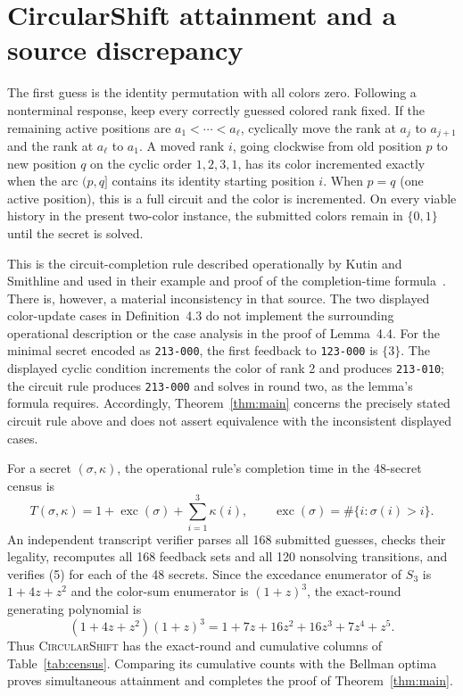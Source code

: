 \documentclass[11pt]{article}
\newcommand{\bits}{\{0,1\}}
\begin{document}
\section{CircularShift attainment and a source discrepancy}\label{sec:cs}

The first guess is the identity permutation with all colors zero.  Following a
nonterminal response, keep every correctly guessed colored rank fixed.  If the
remaining active positions are
$a_1<\cdots<a_\ell$, cyclically move the rank at $a_j$ to $a_{j+1}$ and the
rank at $a_\ell$ to $a_1$.  A moved rank $i$, going clockwise from old position
$p$ to new position $q$ on the cyclic order $1,2,3,1$, has its color incremented
exactly when the arc $(p,q]$ contains its identity starting position $i$.
When $p=q$ (one active position), this is a full circuit and the color is
incremented.  On every viable history in the present two-color instance, the
submitted colors remain in $\bits$ until the secret is solved.

This is the circuit-completion rule described operationally by Kutin and
Smithline and used in their example and proof of the completion-time
formula~\cite[Definition~4.3, Figure~6, and Lemma~4.4]{KutinSmithline2026}.
There is, however, a material inconsistency in that source.  The two displayed
color-update cases in Definition~4.3 do not implement the surrounding
operational description or the case analysis in the proof of Lemma~4.4.  For
the minimal secret encoded as \texttt{213-000}, the first feedback to
\texttt{123-000} is $\{3\}$.  The displayed cyclic condition increments the
color of rank 2 and produces \texttt{213-010}; the circuit rule produces
\texttt{213-000} and solves in round two, as the lemma's formula requires.
Accordingly, Theorem~\ref{thm:main} concerns the precisely stated circuit rule
above and does not assert equivalence with the inconsistent displayed cases.

For a secret $(\sigma,\kappa)$, the operational rule's completion time in the
48-secret census is
\[
 T(\sigma,\kappa)=1+\operatorname{exc}(\sigma)
                    +\sum_{i=1}^3\kappa(i),
 \qquad
 \operatorname{exc}(\sigma)=\#\{i:\sigma(i)>i\}.
 \tag{5}
\]
An independent transcript verifier parses all 168 submitted guesses, checks
their legality, recomputes all 168 feedback sets and all 120 nonsolving
transitions, and verifies (5) for each of the 48 secrets.  Since the excedance
enumerator of $S_3$ is $1+4z+z^2$ and the color-sum enumerator is $(1+z)^3$,
the exact-round generating polynomial is
\[
 (1+4z+z^2)(1+z)^3
 =1+7z+16z^2+16z^3+7z^4+z^5.
 \tag{6}
\]
Thus \textsc{CircularShift} has the exact-round and cumulative columns of
Table~\ref{tab:census}.  Comparing its cumulative counts with the Bellman
optima proves simultaneous attainment and completes the proof of
Theorem~\ref{thm:main}.
\end{document}
